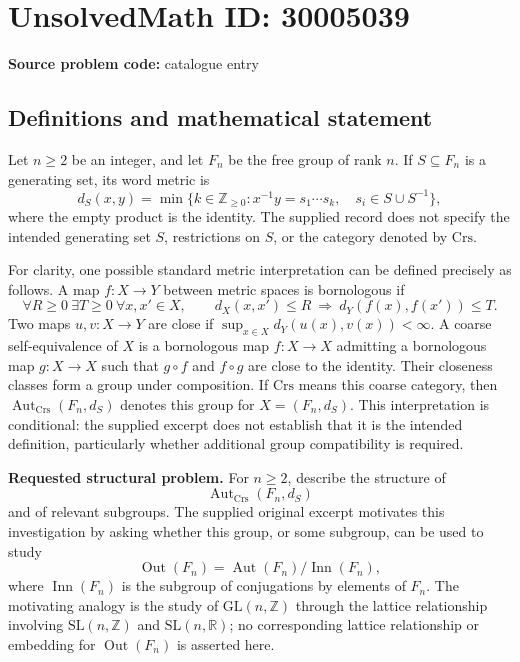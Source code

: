 \documentclass[11pt]{article}
\newcommand{\Z}{\mathbb{Z}}
\newcommand{\R}{\mathbb{R}}
\begin{document}
\section*{UnsolvedMath ID: 30005039}
\textbf{Source problem code:} catalogue entry
\subsection{Definitions and mathematical statement}
Let \(n\geq 2\) be an integer, and let \(F_n\) be the free group of rank \(n\). If \(S\subseteq F_n\) is a generating set, its word metric is
\[
 d_S(x,y)=\min\bigl\{k\in\Z_{\geq 0}:x^{-1}y=s_1\cdots s_k,\quad s_i\in S\cup S^{-1}\bigr\},
\]
where the empty product is the identity. The supplied record does not specify the intended generating set \(S\), restrictions on \(S\), or the category denoted by \(\mathrm{Crs}\).

For clarity, one possible standard metric interpretation can be defined precisely as follows. A map \(f:X\to Y\) between metric spaces is bornologous if
\[
 \forall R\geq 0\ \exists T\geq 0\ \forall x,x'\in X,\qquad
 d_X(x,x')\leq R\ \Longrightarrow\ d_Y(f(x),f(x'))\leq T.
\]
Two maps \(u,v:X\to Y\) are close if \(\sup_{x\in X}d_Y(u(x),v(x))<\infty\). A coarse self-equivalence of \(X\) is a bornologous map \(f:X\to X\) admitting a bornologous map \(g:X\to X\) such that \(g\circ f\) and \(f\circ g\) are close to the identity. Their closeness classes form a group under composition. If \(\mathrm{Crs}\) means this coarse category, then \(\operatorname{Aut}_{\mathrm{Crs}}(F_n,d_S)\) denotes this group for \(X=(F_n,d_S)\). This interpretation is conditional: the supplied excerpt does not establish that it is the intended definition, particularly whether additional group compatibility is required.

\textbf{Requested structural problem.} For \(n\geq 2\), describe the structure of
\[
 \operatorname{Aut}_{\mathrm{Crs}}(F_n,d_S)
\]
and of relevant subgroups. The supplied original excerpt motivates this investigation by asking whether this group, or some subgroup, can be used to study
\[
 \operatorname{Out}(F_n)=\operatorname{Aut}(F_n)/\operatorname{Inn}(F_n),
\]
where \(\operatorname{Inn}(F_n)\) is the subgroup of conjugations by elements of \(F_n\). The motivating analogy is the study of \(\mathrm{GL}(n,\Z)\) through the lattice relationship involving \(\mathrm{SL}(n,\Z)\) and \(\mathrm{SL}(n,\R)\); no corresponding lattice relationship or embedding for \(\operatorname{Out}(F_n)\) is asserted here.
\end{document}
